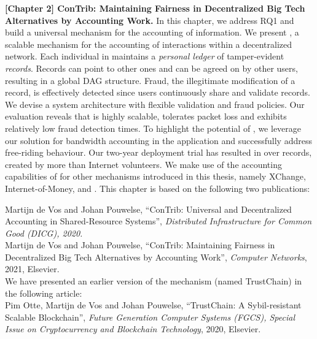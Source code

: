 \textbf{[Chapter 2] ConTrib: Maintaining Fairness in Decentralized Big Tech Alternatives by Accounting Work.}
In this chapter, we address RQ1 and build a universal mechanism for the accounting of information.
We present \TrustChain{}, a scalable mechanism for the accounting of interactions within a decentralized network.
Each individual in \TrustChain{} maintains a \emph{personal ledger} of tamper-evident \emph{records}.
Records can point to other ones and can be agreed on by other users, resulting in a global DAG structure.
Fraud, the illegitimate modification of a record, is effectively detected since users continuously share and validate records.
We devise a system architecture with flexible validation and fraud policies.
Our evaluation reveals that \TrustChain{} is highly scalable, tolerates packet loss and exhibits relatively low fraud detection times.
To highlight the potential of \TrustChain{}, we leverage our solution for bandwidth accounting in the \Tribler{} application and successfully address free-riding behaviour.
Our two-year deployment trial has resulted in over \TrialRecords{} records, created by more than \TrialUsers{} Internet volunteers.
We make use of the accounting capabilities of \TrustChain{} for other mechanisms introduced in this thesis, namely XChange, Internet-of-Money, and \Dappcoder{}.
This chapter is based on the following two publications:

Martijn de Vos and Johan Pouwelse, \enquote{ConTrib: Universal and Decentralized Accounting in Shared-Resource Systems}, \emph{Distributed Infrastructure for Common Good (DICG), 2020.}\\

Martijn de Vos and Johan Pouwelse, \enquote{ConTrib: Maintaining Fairness in Decentralized Big Tech Alternatives by Accounting Work}, \emph{Computer Networks}, 2021, Elsevier.\\

\noindent We have presented an earlier version of the \TrustChain{} mechanism (named TrustChain) in the following article:\\

Pim Otte, Martijn de Vos and Johan Pouwelse, \enquote{TrustChain: A Sybil-resistant Scalable Blockchain}, \emph{Future Generation Computer Systems (FGCS), Special Issue on Cryptocurrency and Blockchain Technology}, 2020, Elsevier.\\

